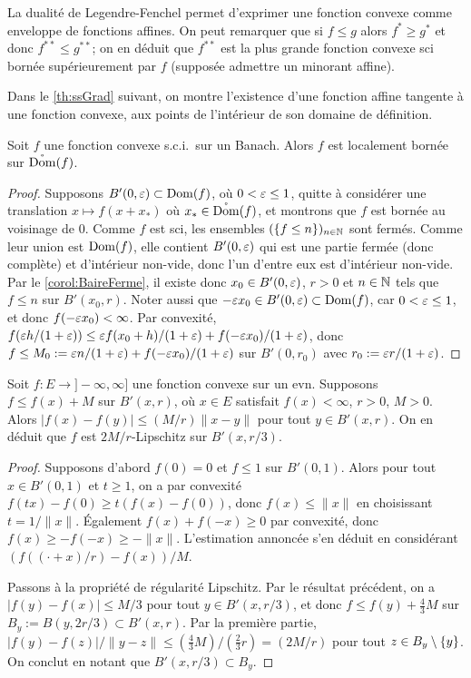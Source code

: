 La dualité de Legendre-Fenchel permet d'exprimer une fonction convexe comme enveloppe de fonctions affines. 
On peut remarquer que si $f\leq g$ alors $f^*\geq g^*$ et donc $f^{**} \leq g^{**}$; on en déduit que  $f^{**}$ est la plus grande fonction convexe sci bornée supérieurement par $f$ (supposée admettre un minorant affine).

Dans le \cref{th:ssGrad} suivant, on montre l'existence d'une fonction affine tangente à une fonction convexe, aux points de l'intérieur de son domaine de définition. 

\begin{lemma}
\label{lem:cvxImplBorne}
	Soit $f$ une fonction convexe s.c.i.\ sur un Banach. Alors $f$ est localement bornée sur $\mathring {\operatorname{Dom}}(f)$. 
\end{lemma}

\begin{proof}
	Supposons $B'(0,\varepsilon) \subset \operatorname{Dom}(f)$, où $0<\varepsilon \leq 1$, quitte à considérer une translation $x \mapsto f(x+x_*)$ où $x_* \in \mathring {\operatorname{Dom}}(f)$, et montrons que $f$ est bornée au voisinage de $0$.
	Comme $f$ est sci, les ensembles $(\{f \leq n\})_{n \in \mathbb{N}}$ sont fermés. Comme leur union est $\operatorname{Dom}(f)$, elle contient $B'(0,\varepsilon)$ qui est une partie fermée (donc complète) et d'intérieur non-vide, donc l'un d'entre eux est d'intérieur non-vide. Par le \cref{corol:BaireFerme}, il existe donc $x_0 \in B'(0,\varepsilon)$, $r>0$ et $n \in \mathbb{N}$ tels que $f\leq n$ sur $B'(x_0,r)$. 
	Noter aussi que $-\varepsilon x_0 \in B'(0,\varepsilon)\subset \operatorname{Dom}(f)$, car $0< \varepsilon \leq 1$, et donc $f(-\varepsilon x_0) < \infty$.
	Par convexité, $f(\varepsilon h/(1+\varepsilon)) \leq \varepsilon f(x_0+h)/(1+\varepsilon) + f(-\varepsilon x_0)/(1+\varepsilon)$, donc $f \leq M_0 := \varepsilon n /(1+\varepsilon) + f(-\varepsilon x_0)/(1+\varepsilon)$ sur $B'(0,r_0)$ avec $r_0 := \varepsilon r/(1+\varepsilon)$.
\end{proof}

\begin{lemma}
\label{lem:cvxImplLip}
	Soit $f : E \to ]-\infty,\infty]$ une fonction convexe sur un evn. Supposons $f \leq f(x) + M$ sur $B'(x,r)$, où $x \in E$ satisfait $f(x)<\infty$, $r>0$, $M > 0$. 
	Alors $|f(x)-f(y)|\leq (M/r) \|x-y\|$ pour tout $y \in B'(x,r)$. On en déduit que $f$ est $2 M/r$-Lipschitz sur $B'(x,r/3)$. 
\end{lemma}

\begin{proof}
	Supposons d'abord $f(0)=0$ et $f \leq 1$ sur $B'(0,1)$. Alors pour tout $x \in B'(0,1)$ et $t \geq 1$, on a par convexité $f(t x)-f(0) \geq t(f(x)-f(0))$, donc $f(x) \leq \|x\|$ en choisissant $t = 1/\|x\|$. Également $f(x)+f(-x) \geq 0$ par convexité, donc $f(x) \geq -f(-x) \geq -\|x\|$. L'estimation annoncée s'en déduit en considérant $(f( (\cdot+x)/r) - f(x))/M$.
	
	Passons à la propriété de régularité Lipschitz. Par le résultat précédent, on a $|f(y)-f(x)|\leq M/3$ pour tout $y\in B'(x,r/3)$, et donc $f \leq f(y) + \frac 4 3 M$ sur $B_y := B(y,2 r/3) \subset B'(x,r)$. Par la première partie, $|f(y)-f(z)|/\|y-z\| \leq (\frac 4 3 M) / (\frac 2 3 r)  = (2 M/r)$ pour tout $z \in B_y\setminus \{y\}$. On conclut en notant que $B'(x,r/3) \subset B_y$. 
\end{proof}

